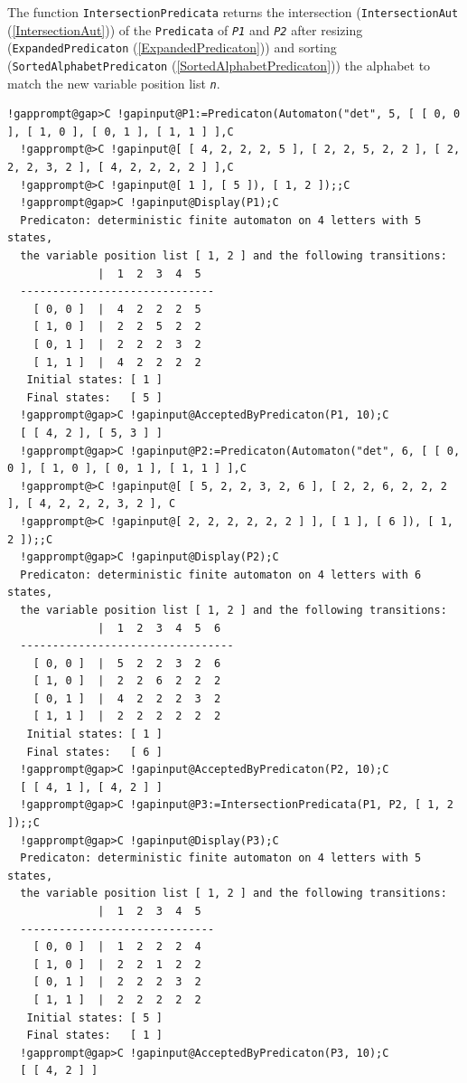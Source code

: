 \documentclass[a4paper,11pt]{report}
\begin{document}
{{{ The function \texttt{IntersectionPredicata} returns the intersection (\texttt{IntersectionAut} (\ref{IntersectionAut})) of the \texttt{Predicata} of \mbox{\texttt{\mdseries\slshape P1}} and \mbox{\texttt{\mdseries\slshape P2}} after resizing (\texttt{ExpandedPredicaton} (\ref{ExpandedPredicaton})) and sorting (\texttt{SortedAlphabetPredicaton} (\ref{SortedAlphabetPredicaton})) the alphabet to match the new variable position list \mbox{\texttt{\mdseries\slshape n}}. 
\begin{Verbatim}[commandchars=!@C,fontsize=\small,frame=single,label=Example]
  !gapprompt@gap>C !gapinput@P1:=Predicaton(Automaton("det", 5, [ [ 0, 0 ], [ 1, 0 ], [ 0, 1 ], [ 1, 1 ] ],C
  !gapprompt@>C !gapinput@[ [ 4, 2, 2, 2, 5 ], [ 2, 2, 5, 2, 2 ], [ 2, 2, 2, 3, 2 ], [ 4, 2, 2, 2, 2 ] ],C
  !gapprompt@>C !gapinput@[ 1 ], [ 5 ]), [ 1, 2 ]);;C
  !gapprompt@gap>C !gapinput@Display(P1);C
  Predicaton: deterministic finite automaton on 4 letters with 5 states, 
  the variable position list [ 1, 2 ] and the following transitions:
              |  1  2  3  4  5  
  ------------------------------
    [ 0, 0 ]  |  4  2  2  2  5  
    [ 1, 0 ]  |  2  2  5  2  2  
    [ 0, 1 ]  |  2  2  2  3  2  
    [ 1, 1 ]  |  4  2  2  2  2  
   Initial states: [ 1 ]
   Final states:   [ 5 ]
  !gapprompt@gap>C !gapinput@AcceptedByPredicaton(P1, 10);C
  [ [ 4, 2 ], [ 5, 3 ] ]
  !gapprompt@gap>C !gapinput@P2:=Predicaton(Automaton("det", 6, [ [ 0, 0 ], [ 1, 0 ], [ 0, 1 ], [ 1, 1 ] ],C
  !gapprompt@>C !gapinput@[ [ 5, 2, 2, 3, 2, 6 ], [ 2, 2, 6, 2, 2, 2 ], [ 4, 2, 2, 2, 3, 2 ], C
  !gapprompt@>C !gapinput@[ 2, 2, 2, 2, 2, 2 ] ], [ 1 ], [ 6 ]), [ 1, 2 ]);;C
  !gapprompt@gap>C !gapinput@Display(P2);C
  Predicaton: deterministic finite automaton on 4 letters with 6 states,
  the variable position list [ 1, 2 ] and the following transitions:
              |  1  2  3  4  5  6  
  ---------------------------------
    [ 0, 0 ]  |  5  2  2  3  2  6  
    [ 1, 0 ]  |  2  2  6  2  2  2  
    [ 0, 1 ]  |  4  2  2  2  3  2  
    [ 1, 1 ]  |  2  2  2  2  2  2  
   Initial states: [ 1 ]
   Final states:   [ 6 ]
  !gapprompt@gap>C !gapinput@AcceptedByPredicaton(P2, 10);C
  [ [ 4, 1 ], [ 4, 2 ] ]
  !gapprompt@gap>C !gapinput@P3:=IntersectionPredicata(P1, P2, [ 1, 2 ]);;C
  !gapprompt@gap>C !gapinput@Display(P3);C
  Predicaton: deterministic finite automaton on 4 letters with 5 states, 
  the variable position list [ 1, 2 ] and the following transitions:
              |  1  2  3  4  5  
  ------------------------------
    [ 0, 0 ]  |  1  2  2  2  4  
    [ 1, 0 ]  |  2  2  1  2  2  
    [ 0, 1 ]  |  2  2  2  3  2  
    [ 1, 1 ]  |  2  2  2  2  2  
   Initial states: [ 5 ]
   Final states:   [ 1 ]
  !gapprompt@gap>C !gapinput@AcceptedByPredicaton(P3, 10);C
  [ [ 4, 2 ] ]
\end{Verbatim}
 }

}}
\end{document}
